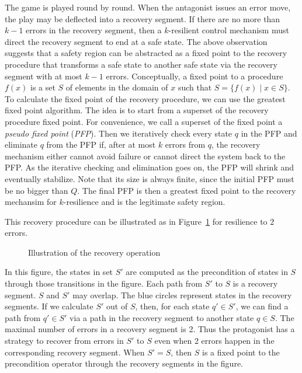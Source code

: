 The game is played round by round. 
When the antagonist issues an error move, 
the play may be deflected into a recovery segment.  
If there are no more than $k-1$ errors in the recovery segment, 
then a $k$-resilient control mechanism must direct the recovery segment
to end at a safe state. 
The above observation suggests that 
a safety region can be abstracted as a fixed point 
to the recovery procedure 
that transforms a safe state to another safe state via the recovery segment 
with at most $k-1$ errors. 
Conceptually, a fixed point to a procedure $f(x)$ is a set $S$ of elements 
in the domain of $x$ such that $S=\{f(x)\mid x\in S\}$.  
To calculate the fixed point of the recovery procedure, 
we can use the greatest fixed point algorithm.  
The idea is to start from a superset of the recovery procedure fixed point. 
For convenience, we call a superset of the fixed point a {\em pseudo fixed point} 
({\em PFP}).  
Then we iteratively check every state $q$ in the PFP and eliminate 
$q$ from the PFP if, after at most $k$ errors from $q$, 
the recovery mechanism either cannot avoid failure or 
cannot direct the system back to the PFP. 
As the iterative checking and elimination goes on, 
the PFP will shrink and eventually stabilize.
Note that its size is always finite, 
since the initial PFP must be no bigger than $Q$.  
The final PFP is then a greatest fixed point to the recovery mechansim for 
$k$-resilience and is the legitimate safety region.  
 

This recovery procedure can be illustrated as in Figure~\ref{fig.sfrch} 
for resilience to $2$ errors.  
\begin{figure}[t]
\begin{center}
\caption{Illustration of the recovery operation}
\label{fig.sfrch} 
\end{center}
\end{figure}  
In this figure, the states in set $S'$ are computed  
as the precondition of states in $S$ through those transitions in the figure.  
Each path from $S'$ to $S$ is a recovery segment. 
$S$ and $S'$ may overlap.  
The blue circles represent states in the recovery segments.  
If we calculate $S'$ out of $S$, 
then, for each state $q'\in S'$, we can find a path from 
$q'\in S'$ via a path in the recovery segment to another state $q\in S$.  
The maximal number of errors in a recovery segment is 2.  
Thus the protagonist has a strategy to recover from errors in $S'$ to $S$ 
even when 2 errors happen in the corresponding recovery segment.  
When $S'=S$, then $S$ is a fixed point to the precondition 
operator through the recovery segments in the figure.  

